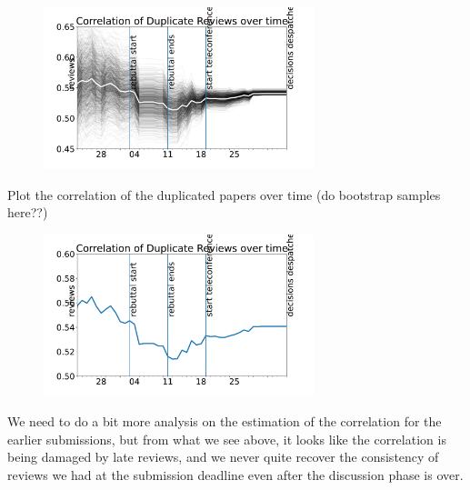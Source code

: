 \begin{Shaded}
\begin{Highlighting}[]
\end{Highlighting}
\end{Shaded}

\begin{figure}[htb]
\includegraphics[width=0.70\textwidth]{diagrams/neurips/correlation-duplicate-reviews-bootstrap.pdf}


\caption{}
\label{correlation-duplicate-reviews-bootstrap}
\end{figure}

Plot the correlation of the duplicated papers over time (do bootstrap
samples here??)

\begin{figure}[htb]
\includegraphics[width=0.70\textwidth]{diagrams/neurips/correlation-duplicate-reviews.pdf}


\caption{}
\label{correlation-duplicate-reviews}
\end{figure}

We need to do a bit more analysis on the estimation of the correlation
for the earlier submissions, but from what we see above, it looks like
the correlation is being damaged by late reviews, and we never quite
recover the consistency of reviews we had at the submission deadline
even after the discussion phase is over.

